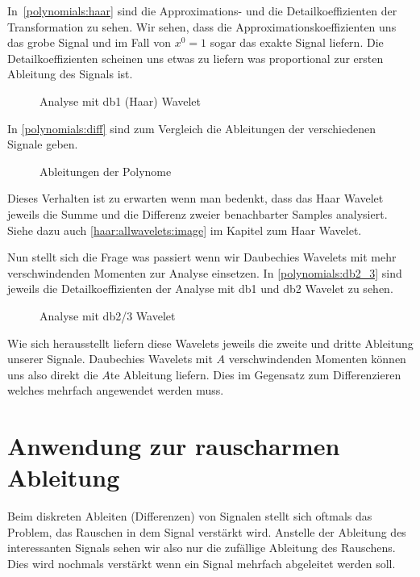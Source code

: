 \begin{refsection}
In~\autoref{polynomials:haar} sind die Approximations- und die Detailkoeffizienten
der Transformation zu sehen. Wir sehen, dass die Approximationskoeffizienten
uns das grobe Signal und im Fall von $x^0 = 1$ sogar das exakte Signal liefern. Die
Detailkoeffizienten scheinen uns etwas zu liefern was proportional zur ersten
Ableitung des Signals ist.

\begin{figure}
    \centering
    
    \caption{Analyse mit db1 (Haar) Wavelet\label{polynomials:haar}}
\end{figure}

In \autoref{polynomials:diff} sind zum Vergleich die Ableitungen der
verschiedenen Signale geben.

\begin{figure}
    \centering
    
    \caption{Ableitungen der Polynome\label{polynomials:diff}}
\end{figure}

Dieses Verhalten ist zu erwarten wenn man bedenkt, dass das Haar Wavelet
jeweils die Summe und die Differenz zweier benachbarter Samples analysiert.
Siehe dazu auch \autoref{haar:allwavelets:image} im Kapitel zum Haar Wavelet.

Nun stellt sich die Frage was passiert wenn wir Daubechies Wavelets mit mehr
verschwindenden Momenten zur Analyse einsetzen. In \autoref{polynomials:db2_3}
sind jeweils die Detailkoeffizienten der Analyse mit db1 und db2 Wavelet zu
sehen.

\begin{figure}
    \centering
    
    \caption{Analyse mit db2/3 Wavelet\label{polynomials:db2_3}}
\end{figure}

Wie sich herausstellt liefern diese Wavelets jeweils die zweite und dritte
Ableitung unserer Signale. Daubechies Wavelets mit $A$ verschwindenden Momenten
können uns also direkt die $A$te Ableitung liefern. Dies im Gegensatz zum
Differenzieren welches mehrfach angewendet werden muss.

\section{Anwendung zur rauscharmen Ableitung}

Beim diskreten Ableiten (Differenzen) von Signalen stellt sich oftmals das
Problem, das Rauschen in dem Signal verstärkt wird. Anstelle der Ableitung des
interessanten Signals sehen wir also nur die zufällige Ableitung des Rauschens.
Dies wird nochmals verstärkt wenn ein Signal mehrfach abgeleitet werden soll.


\end{refsection}
